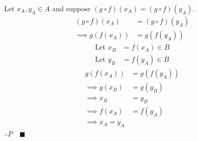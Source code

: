 \documentclass[letterpaper, 12pt]{article}
\newcommand{\qed}{\quad \blacksquare}
\newcommand{\0}{\emptyset}
\begin{document}
\begin{enumerate}
Let $x_A, y_A \in A$ and suppose $(g \circ f)(x_A) = (g \circ f)(y_A)$.
\begin{align*}
    (g \circ f)(x_A) &= (g \circ f)(y_A) \\
    \implies g(f(x_A)) &= g(f(y_A))
\end{align*}
\begin{align*}
    \text{Let } x_B &= f(x_A) \in B \\
    \text{Let } y_B &= f(y_A) \in B
\end{align*}
\begin{align*}
    g(f(x_A)) &= g(f(y_A)) \\
    \implies g(x_B) &= g(y_B) \\
    \implies x_B &= y_B \\
    \implies f(x_A) &= f(y_A) \\
    \implies x_A = y_A
\end{align*}
$\therefore P \qed$
\end{enumerate}
\end{document}
